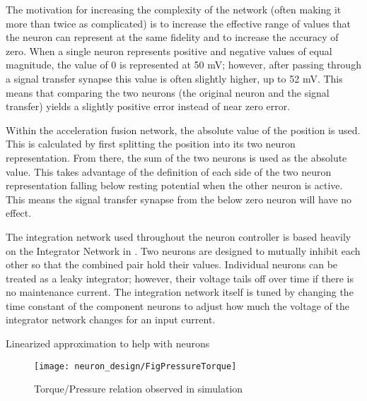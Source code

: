 The motivation for increasing the complexity of the
network (often making it more than twice as complicated) is to increase the
effective range of values that the neuron can represent at the same fidelity and
to increase the accuracy of zero. When a single neuron represents positive and
negative values of equal magnitude, the value of 0 is represented at 50 mV; 
however, after passing through a signal transfer synapse this value is often
slightly higher, up to 52 mV. This means that comparing the two neurons (the
original neuron and the signal transfer) yields a slightly positive error
instead of near zero error.



Within the acceleration fusion network, the absolute value of the position is
used. This is calculated by first splitting the position into its two neuron
representation. From there, the sum of the two neurons is used as the absolute
value. This takes advantage of the definition of each side of the two neuron
representation falling below resting potential when the other neuron is active.
This means the signal transfer synapse from the below zero neuron will have no
effect.



The integration network used throughout the neuron controller is based heavily
on the Integrator Network in \cite{NickFunctionalSubnetwork}. Two neurons are
designed to mutually inhibit each other so that the combined pair hold their
values. Individual neurons can be treated as a leaky integrator; however, their
voltage tails off over time if there is no maintenance current. The integration
network itself is tuned by changing the time constant of the component neurons
to adjust how much the voltage of the integrator network changes for an input
current.


Linearized approximation to help with neurons

\begin{figure}[h!]
\centering
\texttt{[image: neuron\_design/FigPressureTorque]}
\caption{Torque/Pressure relation observed in simulation}
\label{fig:PressureTorque}
\end{figure}

